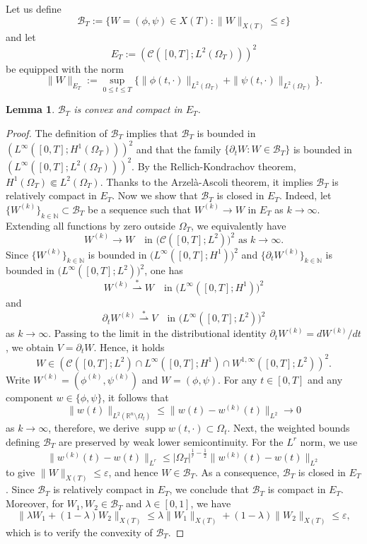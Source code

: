 \documentclass[11pt,reqno]{amsart}
\DeclareMathOperator{\supp}{supp}
\newtheorem{lemma}{Lemma}[section]
\newcommand{\ity}{\infty}
\begin{document}
	 Let us define
	\[
	\mathcal{B}_T:=\{W=(\phi,\psi)\in X(T):\|W\|_{X(T)}\leq \varepsilon\}
	\]
	and let
	\[
	E_T:=\left(\mathcal{C}([0,T];L^2(\Omega_T))\right)^2
	\]
	be equipped with the norm
	\[
	\|W\|_{E_T}:=\sup_{0\leq t\leq T}\Big\{\|\phi(t,\cdot)\|_{L^2(\Omega_T)}+\|\psi(t,\cdot)\|_{L^2(\Omega_T)}\Big\}.
	\] 
	\begin{lemma}
		$\mathcal{B}_T$ is convex and compact in $E_T$.
	\end{lemma}
	\begin{proof}
		The definition of $\mathcal{B}_T$ implies that $\mathcal{B}_T$ is bounded in $(L^\infty([0,T];H^1(\Omega_T)))^2$ and that the family $\{\partial_tW:W\in\mathcal{B}_T\}$ is bounded in $(L^{\infty}([0,T];L^2(\Omega_T)))^2$. By the Rellich-Kondrachov theorem, $H^1(\Omega_T)\Subset L^2(\Omega_T)$. Thanks to the Arzel\`a-Ascoli theorem, it implies $\mathcal{B}_T$ is relatively compact in $E_T$. Now we show that $\mathcal{B}_T$ is closed in $E_T$. Indeed, let $\{W^{(k)}\}_{k\in\mathbb N}\subset \mathcal{B}_T$ be a sequence such that $W^{(k)}\to W$ in $E_T$ as $k\to \ity$. Extending all functions by zero outside $\Omega_T$, we equivalently have
		\[
		W^{(k)}\to W
		\quad\text{in }
		\bigl(\mathcal{C}([0,T];L^2)\bigr)^2\text{ as }k\to \ity.
		\]
		Since $\{W^{(k)}\}_{k\in \mathbb N}$ is bounded in $\bigl(L^\infty([0,T];H^1)\bigr)^2$ and $\{\partial_tW^{(k)}\}_{k\in \mathbb N}$ is bounded in $\bigl(L^\infty([0,T];L^2)\bigr)^2$, one has
		\[
		W^{(k)}\stackrel{*}{\rightharpoonup} W
		\quad\text{in }\bigl(L^\infty([0,T];H^1)\bigr)^2
		\]
		and
		\[
		\partial_tW^{(k)}\stackrel{*}{\rightharpoonup} V\quad\text{in }\bigl(L^\infty([0,T];L^2)\bigr)^2
		\]
		as $k\to\ity$. Passing to the limit in the distributional identity
		$\partial_tW^{(k)}=dW^{(k)}/dt$, we obtain $V=\partial_tW$.
		Hence, it holds
		\[
		W\in\left(\mathcal{C}([0,T];L^2)\cap L^\infty([0,T];H^1)\cap W^{1,\infty}([0,T];L^2)\right)^2.
		\]
		Write $W^{(k)}=(\phi^{(k)},\psi^{(k)})$ and $W=(\phi,\psi)$. For any $t\in[0,T]$ and any component $w\in\{\phi,\psi\}$, it follows that
		\[
		\|w(t)\|_{L^2(\mathbb R^n\setminus\Omega_t)}
		\leq\|w(t)-w^{(k)}(t)\|_{L^2}\to0
		\]
		as $k\to\ity$, therefore, we derive $\supp w(t,\cdot)\subset\Omega_t$. Next, the weighted bounds defining $\mathcal{B}_T$ are preserved by weak lower semicontinuity. For the $L^r$ norm, we use
		\[
		\|w^{(k)}(t)-w(t)\|_{L^r}
		\leq |\Omega_T|^{\frac1r-\frac12}
		\|w^{(k)}(t)-w(t)\|_{L^2}
		\]
		to give $\|W\|_{X(T)}\leq\varepsilon$, and hence $W\in \mathcal{B}_T$. As a consequence, $\mathcal{B}_T$ is closed in $E_T$. Since $\mathcal{B}_T$ is relatively compact in $E_T$, we conclude that $\mathcal{B}_T$ is compact in $E_T$. Moreover, for $W_1,W_2\in \mathcal{B}_T$ and $\lambda\in [0,1]$, we have
		\[
		\|\lambda W_1+(1-\lambda)W_2\|_{X(T)}\leq \lambda \|W_1\|_{X(T)}+(1-\lambda)\|W_2\|_{X(T)}\leq \varepsilon,
		\]
		which is to verify the convexity of $\mathcal{B}_T$.
	\end{proof}
	
\end{document}
